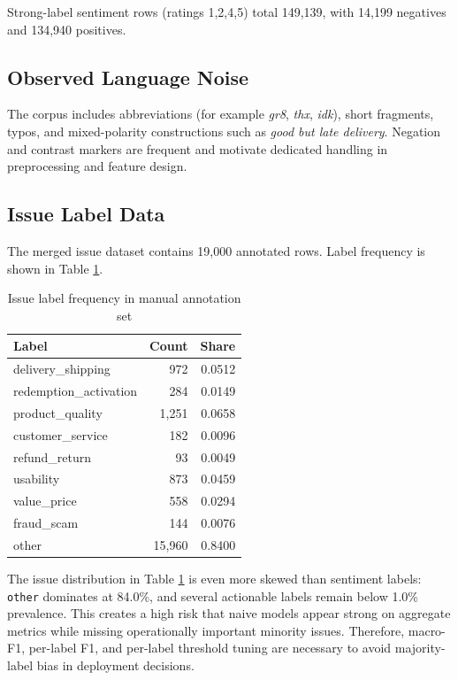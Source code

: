\documentclass[12pt,a4paper]{article}
\begin{document}
Strong-label sentiment rows (ratings 1,2,4,5) total 149,139, with 14,199 negatives and 134,940 positives.

\subsection{Observed Language Noise}
The corpus includes abbreviations (for example \textit{gr8}, \textit{thx}, \textit{idk}), short fragments, typos, and mixed-polarity constructions such as \textit{good but late delivery}. Negation and contrast markers are frequent and motivate dedicated handling in preprocessing and feature design.

\subsection{Issue Label Data}
The merged issue dataset contains 19,000 annotated rows. Label frequency is shown in Table \ref{tab:issue_freq}.

\begin{table}[H]
\centering
\caption{Issue label frequency in manual annotation set}
\label{tab:issue_freq}
\begin{tabular}{lrr}
\toprule
Label & Count & Share \\
\midrule
delivery\_shipping & 972 & 0.0512 \\
redemption\_activation & 284 & 0.0149 \\
product\_quality & 1,251 & 0.0658 \\
customer\_service & 182 & 0.0096 \\
refund\_return & 93 & 0.0049 \\
usability & 873 & 0.0459 \\
value\_price & 558 & 0.0294 \\
fraud\_scam & 144 & 0.0076 \\
other & 15,960 & 0.8400 \\
\bottomrule
\end{tabular}
\end{table}

The issue distribution in Table \ref{tab:issue_freq} is even more skewed than sentiment labels: \texttt{other} dominates at 84.0\%, and several actionable labels remain below 1.0\% prevalence. This creates a high risk that naive models appear strong on aggregate metrics while missing operationally important minority issues. Therefore, macro-F1, per-label F1, and per-label threshold tuning are necessary to avoid majority-label bias in deployment decisions.
\end{document}
